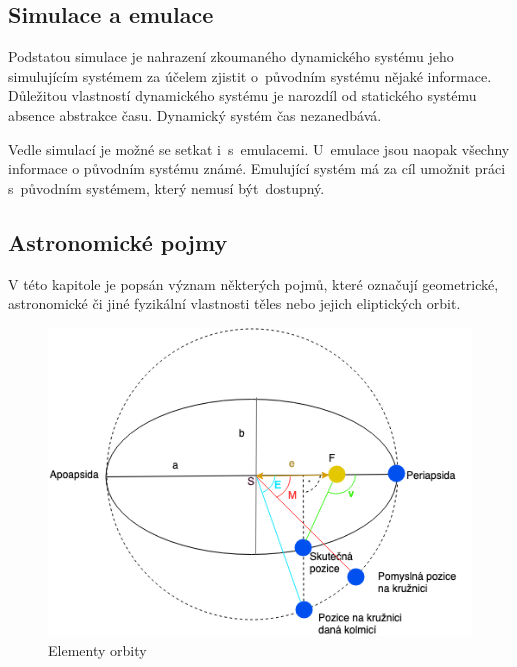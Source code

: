 \documentclass[a4paper,12pt]{article}
\begin{document}
\subsection{Simulace a emulace}

Podstatou simulace je nahrazení zkoumaného dynamického systému jeho simulujícím systémem za účelem zjistit o~původním systému nějaké informace. Důležitou vlastností dynamického systému je narozdíl od statického systému absence abstrakce času. Dynamický systém čas nezanedbává.~\cite{simulations} 

Vedle simulací je možné se setkat i~s~emulacemi. U~emulace jsou naopak všechny informace o původním systému známé. Emulující systém má za cíl umožnit práci s~původním systémem, který nemusí být~dostupný.~\cite{emulations}

\subsection{Astronomické pojmy}

V této kapitole je popsán význam některých pojmů, které označují geometrické, astronomické či jiné fyzikální vlastnosti těles nebo jejich eliptických orbit.

\begin{figure}[H]
\begin{center}
\includegraphics[width=350pt]{Images/Orbit.png}
\caption[Elementy orbity]{Elementy orbity \footnotemark}
\end{center}
\end{figure}

\end{document}
